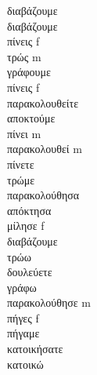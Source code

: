 διαβάζουμε  \\ 
διαβάζουμε  \\ 
πίνεις f \\ 
τρώς m \\ 
γράφουμε  \\ 
πίνεις f \\ 
παρακολουθείτε  \\ 
αποκτούμε  \\ 
πίνει m \\ 
παρακολουθεί m \\ 
πίνετε  \\ 
τρώμε  \\ 
παρακολούθησα  \\ 
απόκτησα  \\ 
μίλησε f \\ 
διαβάζουμε  \\ 
τρώω  \\ 
δουλεύετε  \\ 
γράφω  \\ 
παρακολούθησε m \\ 
πήγες f \\ 
πήγαμε  \\ 
κατοικήσατε  \\ 
κατοικώ  \\ 
